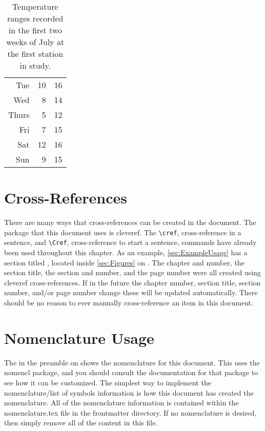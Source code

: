 \begin{table}
\begin{subtable}[h]{0.375\textwidth}
\begin{tabular}{r r r}
                Tue   & 10 & 16 \\
                Wed   & 8  & 14 \\
                Thurs & 5  & 12 \\
                Fri   & 7  & 15 \\
                Sat   & 12 & 16 \\
                Sun   & 9  & 15 \\
                \hline
            \end{tabular}
        \end{subtable}
        \caption{Temperature ranges recorded in the first two weeks of July at the first station in study.}
        \label{tab:temps}
    \end{table}

\section{Cross-References} \label{sec:CrossReferences}
    There are many ways that cross-references can be created in the document.
    The package that this document uses is cleveref.
    The \lstinline|\cref|, cross-reference in a sentence, and \lstinline|\Cref|, cross-reference to start a sentence, commands have already been used throughout this chapter.
    As an example, \cref{sec:ExampleUsage} has a section titled , located inside \cref{sec:Figures} on .
    The chapter and number, the section title, the section and number, and the page number were all created using cleveref cross-references.
    If in the future the chapter number, section title, section number, and/or page number change these will be updated automatically.
    There should be no reason to ever manually cross-reference an item in this document.

\section{Nomenclature Usage} \label{sec:NomenclatureUsage}
    The  in the preamble on  shows the nomenclature for this document.
    This uses the nomencl package, and you should consult the documentation for that package to see how it can be customized.
    The simplest way to implement the nomenclature/list of symbols information is how this document has created the nomenclature.
    All of the nomenclature information is contained within the nomenclature.tex file in the frontmatter directory.
    If no nomenclature is desired, then simply remove all of the content in this file.

